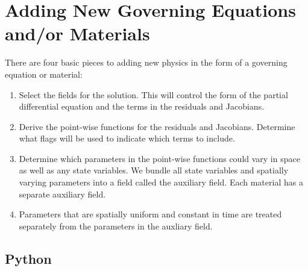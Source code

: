 \section{Adding New Governing Equations and/or Materials}

There are four basic pieces to adding new physics in the form of a
governing equation or material:
\begin{enumerate}
\item Select the fields for the solution. This will control the form
  of the partial differential equation and the terms in the residuals
  and Jacobians.
\item Derive the point-wise functions for the residuals and
  Jacobians. Determine what flags will be used to indicate which terms
  to include.
\item Determine which parameters in the point-wise functions could
  vary in space as well as any state variables. We bundle all state variables
  and spatially varying parameters into a field called the auxiliary
  field. Each material has a separate auxiliary field.
\item Parameters that are spatially uniform and constant in time
  are treated separately from the parameters in the auxliary field.
\end{enumerate}

\subsection{Python}

